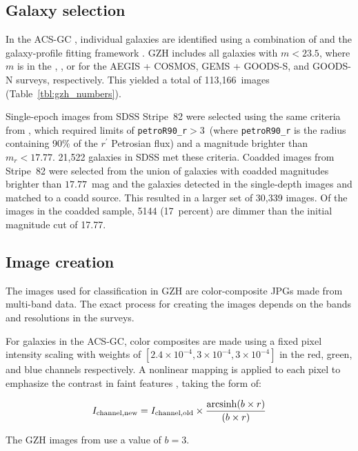 \documentclass[twocolumn]{aastex6}
\begin{document}
\subsection{Galaxy selection}

In the ACS-GC \citep{gri12}, individual galaxies are identified using a combination of \sextractor{} \citep{ber96} and the galaxy-profile fitting framework \galapagos{} \citep{bar12}. GZH includes all galaxies with $m < 23.5$, where $m$ is in the \Iband, \zband, or \iband{} for the AEGIS + COSMOS, GEMS + GOODS-S, and GOODS-N surveys, respectively. This yielded a total of 113,166~images (Table~\ref{tbl:gzh_numbers}).

Single-epoch images from SDSS Stripe~82 were selected using the same criteria from \citet{wil13}, which required limits of \texttt{petroR90\_r}$ > 3$\arcsec~(where \texttt{petroR90\_r} is the radius containing 90\% of the $r^\prime$ Petrosian flux) and a magnitude brighter than $m_r < 17.77$. 21,522 galaxies in SDSS met these criteria. Coadded images from Stripe~82 were selected from the union of galaxies with coadded magnitudes brighter than $17.77$~mag and the galaxies detected in the single-depth images and matched to a coadd source. This resulted in a larger set of 30,339 images. Of the images in the coadded sample, 5144 (17~percent) are dimmer than the initial magnitude cut of 17.77. 

\subsection{Image creation}

The images used for classification in GZH are color-composite JPGs made from multi-band data. The exact process for creating the images depends on the bands and resolutions in the surveys. 

For galaxies in the ACS-GC, color composites are made using a fixed pixel intensity scaling with weights of $[2.4\times10^{-4},3\times10^{-4},3\times10^{-4}]$ in the red, green, and blue channels respectively. A nonlinear mapping is applied to each pixel to emphasize the contrast in faint features \citep{lup04}, taking the form of:

\begin{equation}
I_\mathrm{channel,new} = I_\mathrm{channel,old} \times \frac{\arcsinh(b\times r)}{(b\times r)}
\label{eqn:nonlinear}
\end{equation}

\noindent The GZH images from \citet{gri12} use a value of $b=3$. 
\end{document}
